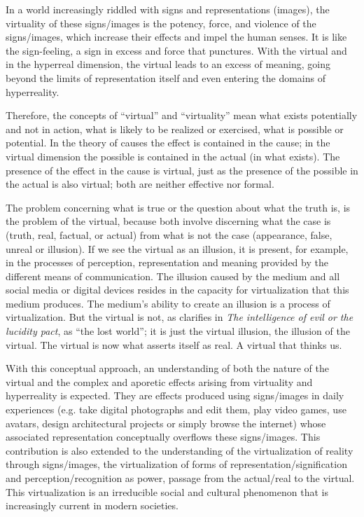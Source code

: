 \documentclass[english]{textolivre}
\begin{document}
In a world increasingly riddled with signs and representations (images), the virtuality of these signs/images is the potency, force, and violence of the signs/images, which increase their effects and impel the human senses. It is like the sign-feeling, a sign in excess and force that punctures. With the virtual and in the hyperreal dimension, the virtual leads to an excess of meaning, going beyond the limits of representation itself and even entering the domains of hyperreality.

Therefore, the concepts of “virtual” and “virtuality” mean what exists potentially and not in action, what is likely to be realized or exercised, what is possible or potential. In the theory of causes the effect is contained in the cause; in the virtual dimension the possible is contained in the actual (in what exists). The presence of the effect in the cause is virtual, just as the presence of the possible in the actual is also virtual; both are neither effective nor formal.

The problem concerning what is true or the question about what the truth is, is the problem of the virtual, because both involve discerning what the case is (truth, real, factual, or actual) from what is not the case (appearance, false, unreal or illusion). If we see the virtual as an illusion, it is present, for example, in the processes of perception, representation and meaning provided by the different means of communication. The illusion caused by the medium and all social media or digital devices resides in the capacity for virtualization that this medium produces. The medium’s ability to create an illusion is a process of virtualization. But the virtual is not, as \textcite[p.~83]{baudrillard_intelligence_2005} clarifies in \textit{The intelligence of evil or the lucidity pact}, as “the lost world”; it is just the virtual illusion, the illusion of the virtual. The virtual is now what asserts itself as real. A virtual that thinks us.

With this conceptual approach, an understanding of both the nature of the virtual and the complex and aporetic effects arising from virtuality and hyperreality is expected. They are effects produced using signs/images in daily experiences (e.g. take digital photographs and edit them, play video games, use avatars, design architectural projects or simply browse the internet) whose associated representation conceptually overflows these signs/images. This contribution is also extended to the understanding of the virtualization of reality through signs/images, the virtualization of forms of representation/signification and perception/recognition as power, passage from the actual/real to the virtual. This virtualization is an irreducible social and cultural phenomenon that is increasingly current in modern societies.

\printbibliography\label{sec-bib}
\end{document}
